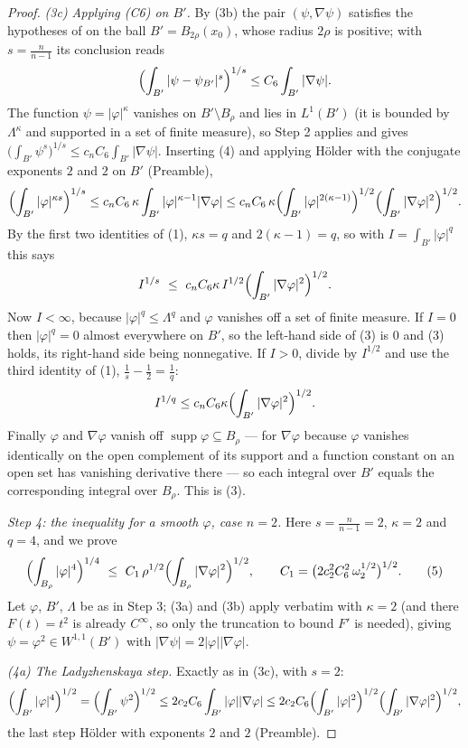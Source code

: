 \begin{proof}
\emph{(3c) Applying (C6) on $B'$.}  By (3b) the pair $(\psi,\nabla\psi)$
satisfies the hypotheses of  on the ball
$B'=B_{2\rho}(x_0)$, whose radius $2\rho$ is positive; with $s=\frac n{n-1}$ its
conclusion reads
\[
\Bigl(\int_{B'}|\psi-\psi_{B'}|^{s}\Bigr)^{1/s}\le C_6\int_{B'}|\nabla\psi| .
\]
The function $\psi=|\varphi|^{\kappa}$ vanishes on $B'\setminus B_\rho$ and lies
in $L^1(B')$ (it is bounded by $\Lambda^{\kappa}$ and supported in a set of
finite measure), so Step 2 applies and gives
$\bigl(\int_{B'}\psi^{s}\bigr)^{1/s}\le c_nC_6\int_{B'}|\nabla\psi|$.
Inserting (4) and applying H\"older with the conjugate exponents $2$ and $2$ on
$B'$ (Preamble),
\[
\Bigl(\int_{B'}|\varphi|^{\kappa s}\Bigr)^{1/s}
\le c_nC_6\,\kappa\int_{B'}|\varphi|^{\kappa-1}|\nabla\varphi|
\le c_nC_6\,\kappa
\Bigl(\int_{B'}|\varphi|^{2(\kappa-1)}\Bigr)^{1/2}
\Bigl(\int_{B'}|\nabla\varphi|^{2}\Bigr)^{1/2}.
\]
By the first two identities of (1), $\kappa s=q$ and $2(\kappa-1)=q$, so with
$I=\int_{B'}|\varphi|^{q}$ this says
\[
I^{1/s}\ \le\ c_nC_6\kappa\,I^{1/2}\Bigl(\int_{B'}|\nabla\varphi|^2\Bigr)^{1/2}.
\]
Now $I<\infty$, because $|\varphi|^q\le\Lambda^q$ and $\varphi$ vanishes off a
set of finite measure.  If $I=0$ then $|\varphi|^q=0$ almost everywhere on
$B'$, so the left-hand side of (3) is $0$ and (3) holds, its right-hand side
being nonnegative.  If $I>0$, divide by $I^{1/2}$ and use the third identity of
(1), $\frac1s-\frac12=\frac1q$:
\[
I^{1/q}\le c_nC_6\kappa\Bigl(\int_{B'}|\nabla\varphi|^2\Bigr)^{1/2}.
\]
Finally $\varphi$ and $\nabla\varphi$ vanish off
$\operatorname{supp}\varphi\subseteq B_\rho$ --- for $\nabla\varphi$ because
$\varphi$ vanishes identically on the open complement of its support and a
function constant on an open set has vanishing derivative there --- so each
integral over $B'$ equals the corresponding integral over $B_\rho$.  This is
(3).

\emph{Step 4: the inequality for a smooth $\varphi$, case $n=2$.}  Here
$s=\frac n{n-1}=2$, $\kappa=2$ and $q=4$, and we prove
\[
\Bigl(\int_{B_\rho}|\varphi|^{4}\Bigr)^{1/4}
\ \le\ C_1\,\rho^{1/2}\Bigl(\int_{B_\rho}|\nabla\varphi|^2\Bigr)^{1/2},
\qquad C_1=\bigl(2c_2^2C_6^2\,\omega_2^{1/2}\bigr)^{1/2}.
\tag{5}
\]
Let $\varphi$, $B'$, $\Lambda$ be as in Step 3; (3a) and (3b) apply verbatim
with $\kappa=2$ (and there $F(t)=t^2$ is already $C^\infty$, so only the
truncation to bound $F'$ is needed), giving $\psi=\varphi^2\in W^{1,1}(B')$
with $|\nabla\psi|=2|\varphi||\nabla\varphi|$.

\emph{(4a) The Ladyzhenskaya step.}  Exactly as in (3c), with $s=2$:
\[
\Bigl(\int_{B'}|\varphi|^{4}\Bigr)^{1/2}
=\Bigl(\int_{B'}\psi^{2}\Bigr)^{1/2}
\le2c_2C_6\int_{B'}|\varphi||\nabla\varphi|
\le2c_2C_6\Bigl(\int_{B'}|\varphi|^{2}\Bigr)^{1/2}
\Bigl(\int_{B'}|\nabla\varphi|^{2}\Bigr)^{1/2},
\]
the last step H\"older with exponents $2$ and $2$ (Preamble).


\end{proof}
